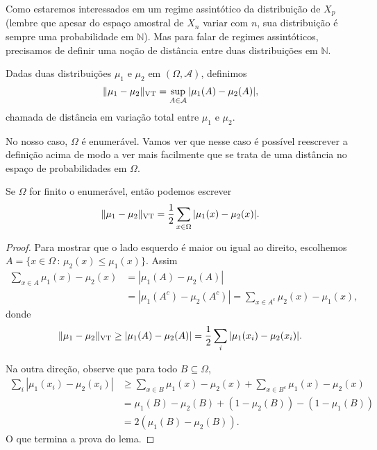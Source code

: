 \begin{topics}
Como estaremos interessados em um regime assintótico da distribuição de $X_p$ (lembre que apesar do espaço amostral de $X_n$ variar com $n$, sua distribuição é sempre uma probabilidade em $\mathbb{N}$).
Mas para falar de regimes assintóticos, precisamos de definir uma noção de distância entre duas distribuições em $\mathbb{N}$.

\begin{definition}
Dadas duas distribuições $\mu_1$ e $\mu_2$ em $(\Omega, \mathcal{A})$, definimos
\begin{equation}
  \lVert \mu_1 - \mu_2 \rVert_{\operatorname{VT}} = \sup_{A \in \mathcal{A}} |\mu_1(A) - \mu_2(A)|,
\end{equation}
 chamada de distância em variação total  entre $\mu_1$ e $\mu_2$.
\end{definition}

No nosso caso, $\Omega$ é enumerável.
Vamos ver que nesse caso é possível reescrever a definição acima de modo a ver mais facilmente que se trata de uma distância no espaço de probabilidades em $\Omega$.

\begin{lemma}
\label{l:vt_l1}
Se $\Omega$ for finito o enumerável, então podemos escrever
\begin{equation}
  \lVert \mu_1 - \mu_2 \rVert_{\operatorname{VT}} = \frac{1}{2} \sum_{x\in \Omega} |\mu_1(x) - \mu_2(x)|.
\end{equation}
\end{lemma}

\begin{proof}
Para mostrar que o lado esquerdo é maior ou igual ao direito, escolhemos $A = \{ x \in \Omega \, : \, \mu_2(x) \leq \mu_1(x)\}$. Assim
\begin{equation}
  \begin{split}
    \sum_{x \in A} \mu_1(x) - \mu_2(x) & = |\mu_1(A) - \mu_2(A)|\\
    & = |\mu_1(A^c) - \mu_2(A^c)| = \sum_{x \in A^c} \mu_2(x) - \mu_1(x),
  \end{split}
\end{equation}
donde
\begin{equation}
  \lVert \mu_1 - \mu_2 \rVert_{\operatorname{VT}} \geq |\mu_1(A) - \mu_2(A)| = \frac{1}{2} \sum_{i} |\mu_1(x_i) - \mu_2(x_i)|.
\end{equation}

Na outra direção, observe que para todo $B \subseteq \Omega$,
\begin{equation}
  \begin{split}
    \sum_{i} |\mu_1(x_i) - \mu_2(x_i)| & \geq \sum_{x \in B} \mu_1(x) - \mu_2(x) + \sum_{x \in B^c} \mu_1(x) - \mu_2(x)\\
    & = \mu_1(B) - \mu_2(B) + (1 - \mu_2(B)) - (1 - \mu_1(B))\\
    & = 2(\mu_1(B) - \mu_2(B)).
  \end{split}
\end{equation}
O que termina a prova do lema.
\end{proof}


\end{topics}
